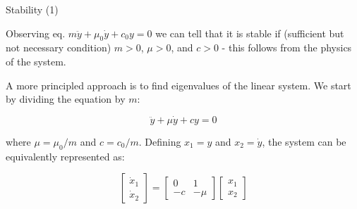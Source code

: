 \documentclass{beamer}
\begin{document}
\begin{frame}{Stability (1)}
\begin{flushleft}

Observing eq. $m \ddot y + \mu_0 \dot y + c_0 y = 0$ we can tell that it is stable if (sufficient but not necessary condition) $m > 0$, $\mu > 0$, and $c > 0$ - this follows from the physics of the system.

\bigskip

A more principled approach is to find eigenvalues of the linear system. We start by dividing the equation by $m$:

\begin{equation}
    \ddot y + \mu \dot y + c y = 0
\end{equation}

where $\mu = \mu_0 / m$ and $c = c_0 / m$. Defining $x_1 = y$ and $x_2 = \dot y$, the system can be equivalently represented as:

\begin{equation}
    \begin{bmatrix}
    \dot x_1 \\ \dot x_2
    \end{bmatrix}
    =
    \begin{bmatrix}
    0 & 1 \\
    -c & -\mu
    \end{bmatrix} 
    \begin{bmatrix}
    x_1 \\ x_2
    \end{bmatrix}   
\end{equation}


\end{flushleft}
\end{frame}
\end{document}
